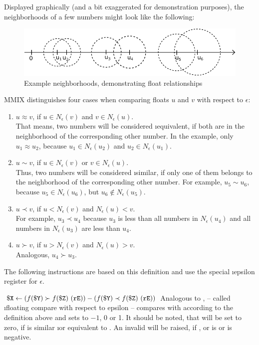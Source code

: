Displayed graphically (and a bit exaggerated for demonstration purposes), the neighborhoods of a few numbers might look like the following:
\begin{figure}[H]
	\centering
	\includegraphics[width=\textwidth]{img/cmpe-less-crop.pdf}
	\caption{Example neighborhoods, demonstrating float relationships}
\end{figure}
\noindent MMIX distinguishes four cases when comparing floats $u$ and $v$ with respect to $\epsilon$:
\begin{enumerate}
	\item $u \approx v$, if $u \in N_\epsilon(v)$ and $v \in N_\epsilon(u)$.\\
	That means, two numbers will be considered \i{equivalent}, if both are in the neighborhood of the corresponding other number. In the example, only $u_1 \approx u_2$, because $u_1 \in N_\epsilon(u_2)$ and $u_2 \in N_\epsilon(u_1)$.
	\item $u \sim v$, if $u \in N_\epsilon(v)$ or $v \in N_\epsilon(u)$.\\
	Thus, two numbers will be considered \i{similar}, if only one of them belongs to the neighborhood of the corresponding other number. For example, $u_5 \sim u_6$, because $u_5 \in N_\epsilon(u_6)$, but $u_6 \notin N_\epsilon(u_5)$.
	\item $u \prec v$, if $u < N_\epsilon(v)$ and $N_\epsilon(u) < v$.\\
	For example, $u_3 \prec u_4$ because $u_3$ is less than all numbers in $N_\epsilon(u_4)$ and all numbers in $N_\epsilon(u_3)$ are less than $u_4$.
	\item $u \succ v$, if $u > N_\epsilon(v)$ and $N_\epsilon(u) > v$.\\
	Analogous, $u_4 \succ u_3$.
\end{enumerate}
\citep[pg. 19]{mmix-doc} The following instructions are based on this definition and use the special \i{epsilon register}  for $\epsilon$.

\instrtbl
	{}
	{${\tt \$X} \leftarrow (f({\tt \$Y}) \succ f({\tt \$Z})~({\tt rE})) - (f({\tt \$Y}) \prec f({\tt \$Z})~({\tt rE}))$}
\noindent Analogous to ,  -- called \i{floating compare with respect to epsilon} -- compares  with  according to the definition above and sets  to $-1$, 0 or 1. It should be noted, that  will be set to zero, if  is similar \i{or} equivalent to . An invalid  will be raised, if ,  or  is \NaN or  is negative. \citep[pg. 19]{mmix-doc}

